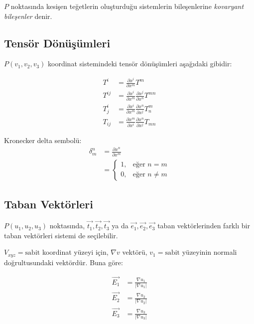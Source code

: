 \documentclass[11pt,letterpaper,twocolumn]{fenbil}
\begin{document}
$P$ noktasında kesişen teğetlerin oluşturduğu sistemlerin bileşenlerine \textit{kovaryant bileşenler} denir.

\subsection{Tensör Dönüşümleri}

$P(v_1, v_2, v_3)$ koordinat sistemindeki tensör dönüşümleri aşağıdaki gibidir:

\begin{align}
T^i &= \frac{\partial x^i}{\partial x^m}T^m \\
T^{ij} &= \frac{\partial x^i}{\partial x^m}\frac{\partial x^j}{\partial x^n}T^{mn} \\
T^i_j &= \frac{\partial x^i}{\partial x^m}\frac{\partial x^n}{\partial x^j}T^m_n \\
T_{ij} &= \frac{\partial x^m}{\partial x^i}\frac{\partial x^n}{\partial x^j}T_{mn}
\end{align}
 
\hspace{25pt}
\hspace{25pt}
\hspace{25pt}

Kronecker delta sembolü:
\begin{align}
\delta^n_m &= \frac{\partial x^n}{\partial x^m} \\
&= \begin{cases}
1, & \text{eğer } n = m \\
0, & \text{eğer } n \neq m
\end{cases}
\end{align}

\subsection{Taban Vektörleri}

$P(u_1, u_2, u_3)$ noktasında, $\vec{t_1}, \vec{t_2}, \vec{t_3}$ ya da $\vec{e_1}, \vec{e_2}, \vec{e_3}$ taban vektörlerinden farklı bir taban vektörleri sistemi de seçilebilir.

$V_{xyz} = \text{sabit}$ koordinat yüzeyi için, $\nabla v$ vektörü, $v_1 = \text{sabit}$ yüzeyinin normali doğrultusundaki vektördür. Buna göre:

\begin{align}
\vec{E_1} &= \frac{\nabla u_1}{|\nabla u_1|} \\
\vec{E_2} &= \frac{\nabla u_2}{|\nabla u_2|} \\
\vec{E_3} &= \frac{\nabla u_3}{|\nabla u_3|}
\end{align}
\end{document}
